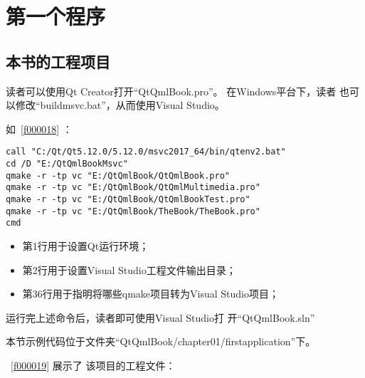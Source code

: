 ﻿




%

\FloatBarrier
\section{
第一个程序
}\label{s100210}


\FloatBarrier
\subsection{
本书的工程项目
}\label{ss001u10}


读者可以使用Qt Creator打开“QtQmlBook.pro”。
在Windows平台下，读者
也可以修改“build\underline{\hspace{0.5em}}msvc.bat”，从而使用Visual Studio。

如\lstlistingname\ \ref{f000018} ：


\FloatBarrier
\begin{lstlisting}[label=f000018,
caption=GoodLuck,
title=\lstlistingname\ \thelstlisting\marginnote{\fbox{\footnotesize{\lstlistingname\ \thelstlisting}}}
]
call "C:/Qt/Qt5.12.0/5.12.0/msvc2017_64/bin/qtenv2.bat"
cd /D "E:/QtQmlBookMsvc"
qmake -r -tp vc "E:/QtQmlBook/QtQmlBook.pro"
qmake -r -tp vc "E:/QtQmlBook/QtQmlMultimedia.pro"
qmake -r -tp vc "E:/QtQmlBook/QtQmlBookTest.pro"
qmake -r -tp vc "E:/QtQmlBook/TheBook/TheBook.pro"
cmd
\end{lstlisting}          %



\begin{itemize}

\item 第1行用于设置Qt运行环境；
\item 第2行用于设置Visual Studio工程文件输出目录；
\item 第3\raisebox{0.16ex}{\sourcefonttwo\~{}}6行用于指明将哪些qmake项目转为Visual Studio项目；

\end{itemize}

运行完上述命令后，读者即可使用Visual Studio打
开“QtQmlBook.sln”

本节示例代码位于文件夹“QtQmlBook/chapter01/firstapplication”下。

\lstlistingname\ \ref{f000019}
展示了
该项目的工程文件：


